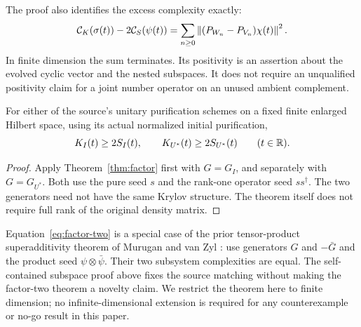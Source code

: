 The proof also identifies the excess complexity exactly:
\begin{equation}\label{eq:flag-gap}
 \mathcal C_K(\sigma(t))-2\mathcal C_S(\psi(t))
 =\sum_{n\ge0}\left\lVert (P_{W_n}-P_{V_n})\chi(t)\right\rVert^2.
\end{equation}
In finite dimension the sum terminates. Its positivity is an assertion
about the evolved cyclic vector and the nested subspaces. It does not
require an unqualified positivity claim for a joint number operator on an
unused ambient complement.

\begin{corollary}\label{cor:branches}
For either of the source's unitary purification schemes on a fixed finite
enlarged Hilbert space, using its actual normalized initial purification,
\begin{equation}\label{eq:branches}
 K_I(t)\ge2S_I(t),\qquad K_{U^*}(t)\ge2S_{U^*}(t)
 \qquad(t\in\mathbb R).
\end{equation}
\end{corollary}
\begin{proof}
Apply Theorem~\ref{thm:factor} first with $G=G_I$, and separately with
$G=G_{U^*}$. Both use the pure seed $s$ and the rank-one operator seed
$ss^\dagger$. The two generators need not have the same Krylov structure.
The theorem itself does not require full rank of the original density matrix.
\end{proof}

Equation~\eqref{eq:factor-two} is a special case of the prior
tensor-product superadditivity theorem of Murugan and van Zyl
\cite{MuruganVanZyl2026}: use generators $G$ and $-\bar G$ and the product
seed $\psi\otimes\bar\psi$. Their two subsystem complexities are equal.
The self-contained subspace proof above fixes the source matching without
making the factor-two theorem a novelty claim. We restrict the theorem here
to finite dimension; no infinite-dimensional extension is required for any
counterexample or no-go result in this paper.
